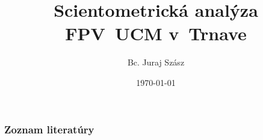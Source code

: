 \documentclass{beamer}
\author{Bc. Juraj Szász}
\title{Scientometrická analýza FPV~UCM v~Trnave}
\date{\today}
\begin{document}

\frame{\maketitle}

\frame{\tableofcontents}









\begin{frame}
  \frametitle{Zoznam literatúry}
{}
\end{frame}
\end{document}
